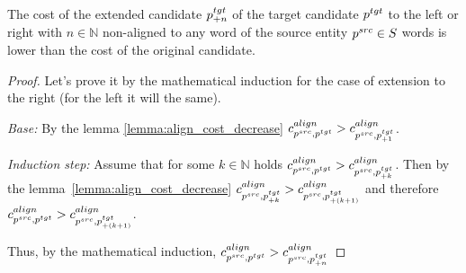 \begin{corollary} \label{col:shrink_cand}
    The cost of the extended candidate \( p_{+n}^{tgt} \) of the target candidate \( p^{tgt} \) to the left or right with
    \( n \in \mathbb{N} \) non-aligned to any word of the source entity \( p^{src} \in S \) words is lower than
    the cost of the original candidate.
\end{corollary}
\begin{proof} Let's prove it by the mathematical induction for the case of extension to the right (for the left it will the same).

    \textit{Base:} By the lemma \ref{lemma:align_cost_decrease} \( c_{p^{src}, p^{tgt}}^{align} > c_{p^{src}, p_{+1}^{tgt}}^{align} \).

    \textit{Induction step:} Assume that for some \( k \in \mathbb{N} \) holds \( c_{p^{src}, p^{tgt}}^{align} > c_{p^{src}, p_{+k}^{tgt}}^{align} \).
    Then by the lemma~\ref{lemma:align_cost_decrease} \( c_{p^{src}, p_{+k}^{tgt}}^{align} > c_{p^{src}, p_{+(k+1)}^{tgt}}^{align} \) and therefore
    \( c_{p^{src}, p^{tgt}}^{align} > c_{p^{src}, p_{+(k+1)}^{tgt}}^{align} \).

    Thus, by the mathematical induction, \( c_{p^{src}, p^{tgt}}^{align} > c_{p^{src}, p_{+n}^{tgt}}^{align}   \)

\end{proof}

